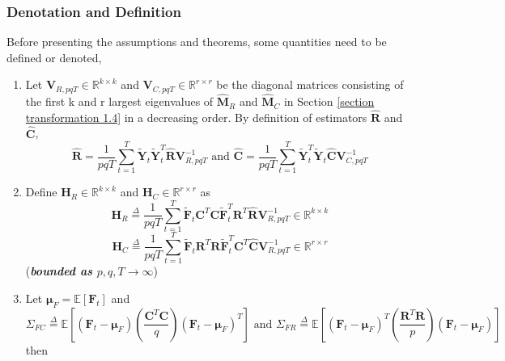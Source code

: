 \documentclass{article}[12pt]
\begin{document}
\subsubsection{Denotation and Definition}
Before presenting the assumptions and theorems, some quantities need to be defined or denoted, 
\begin{enumerate}
    \item  Let $\mathbf{V}_{R,pqT} \in \mathbb{R}^{k \times k}$ and $\mathbf{V}_{C,pqT} \in \mathbb{R}^{r \times r}$ be the diagonal matrices consisting of the first k and r largest eigenvalues of $\mathbf{\widehat{M}}_R$ and $\mathbf{\widehat{M}}_C$ in Section \ref{section transformation 1.4} in a decreasing order. By definition of estimators $\mathbf{\widehat{R}}$ and $\mathbf{\widehat{C}}$,
    \begin{equation}
       \mathbf{\widehat{R}} = \dfrac{1}{pqT}\sum_{t=1}^T\mathbf{\widetilde{Y}}_t\mathbf{\widetilde{Y}}_t^T \mathbf{\widehat{R}} \mathbf{V}_{R,pqT}^{-1} \text{ and } \mathbf{\widehat{C}} = \dfrac{1}{pqT}\sum_{t=1}^T\mathbf{\widetilde{Y}}_t^T\mathbf{\widetilde{Y}}_t \mathbf{\widehat{C}} \mathbf{V}_{C,pqT}^{-1}
    \end{equation}
    \item \noindent Define $\mathbf{H}_R \in \mathbb{R}^{k \times k}$ and $\mathbf{H}_C \in \mathbb{R}^{r \times r}$ as 
    \begin{equation}
       \mathbf{H}_R \overset{\Delta}{=} \dfrac{1}{pqT}\sum_{t=1}^T\mathbf{\widetilde{F}}_t\mathbf{C}^T\mathbf{C}\mathbf{\widetilde{F}}_t^T\mathbf{R}^T\mathbf{\widehat{R}}\mathbf{V}_{R,pqT}^{-1} \in \mathbb{R}^{k \times k}
    \end{equation}
    \begin{equation}
       \mathbf{H}_C \overset{\Delta}{=} \dfrac{1}{pqT}\sum_{t=1}^T\mathbf{\widetilde{F}}_t\mathbf{R}^T\mathbf{R}\mathbf{\widetilde{F}}_t^T\mathbf{C}^T\mathbf{\widehat{C}}\mathbf{V}_{R,pqT}^{-1} \in \mathbb{R}^{r \times r}
    \end{equation}
    \noindent (\textbf{\textit{bounded as $p,q,T \rightarrow \infty $}})
    \item Let $\bm{\mu}_F = \mathbb{E}\left[\mathbf{F}_t\right]$ 
    and
    \begin{equation}
       \Sigma_{FC} \overset{\Delta}{=} \mathbb{E}\left[(\mathbf{F}_t-\bm{\mu}_F)(\dfrac{\mathbf{C}^T\mathbf{C}}{q})(\mathbf{F}_t-\bm{\mu}_F)^T\right] \text{ and } 
       \Sigma_{FR} \overset{\Delta}{=} \mathbb{E}\left[(\mathbf{F}_t-\bm{\mu}_F)^T(\dfrac{\mathbf{R}^T\mathbf{R}}{p})(\mathbf{F}_t-\bm{\mu}_F)\right] 
    \end{equation}
    then 


\end{enumerate}
\end{document}
